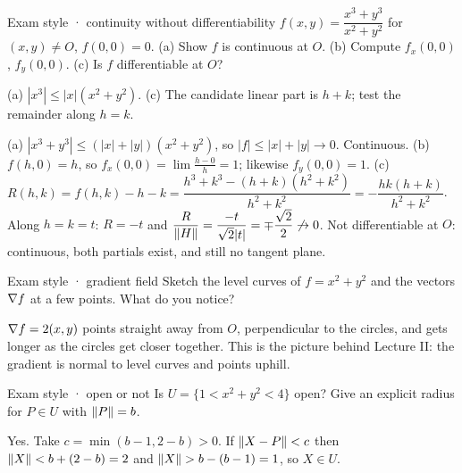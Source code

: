 \begin{problem}{Exam style · continuity without differentiability}
$f(x,y)=\dfrac{x^3+y^3}{x^2+y^2}$ for $(x,y)\ne O$, $f(0,0)=0$. (a) Show $f$ is continuous at $O$.
(b) Compute $f_x(0,0)$, $f_y(0,0)$. (c) Is $f$ differentiable at $O$?
\end{problem}
\begin{hint}(a) $|x^3|\le|x|(x^2+y^2)$. (c) The candidate linear part is $h+k$; test the
remainder along $h=k$.\end{hint}
\begin{solution}
(a) $|x^3+y^3|\le(|x|+|y|)(x^2+y^2)$, so $|f|\le|x|+|y|\to0$. Continuous.
(b) $f(h,0)=h$, so $f_x(0,0)=\lim\frac{h-0}{h}=1$; likewise $f_y(0,0)=1$.
(c) $R(h,k)=f(h,k)-h-k=\dfrac{h^3+k^3-(h+k)(h^2+k^2)}{h^2+k^2}=-\dfrac{hk(h+k)}{h^2+k^2}$. Along $h=k=t$:
$R=-t$ and $\dfrac{R}{\left\lVert H\right\rVert}=\dfrac{-t}{\sqrt2|t|}=\mp\dfrac{\sqrt2}2\not\to0$. Not differentiable at $O$:
continuous, both partials exist, and still no tangent plane.
\end{solution}

\begin{problem}{Exam style · gradient field}
Sketch the level curves of $f=x^2+y^2$ and the vectors $\nabla f$ at a few points. What do you
notice?
\end{problem}
\begin{solution}
$\nabla f=2(x,y)$ points straight away from $O$, perpendicular to the circles, and gets longer
as the circles get closer together. This is the picture behind Lecture II: the gradient is
normal to level curves and points uphill.
\begin{center}
\end{center}
\end{solution}

\begin{problem}{Exam style · open or not}
Is $U=\{1<x^2+y^2<4\}$ open? Give an explicit radius for $P\in U$ with $\left\lVert P\right\rVert=b$.
\end{problem}
\begin{solution}
Yes. Take $c=\min(b-1,2-b)>0$. If $\left\lVert X-P\right\rVert<c$ then $\left\lVert X\right\rVert<b+(2-b)=2$ and $\left\lVert X\right\rVert>b-(b-1)=1$, so
$X\in U$.
\end{solution}

